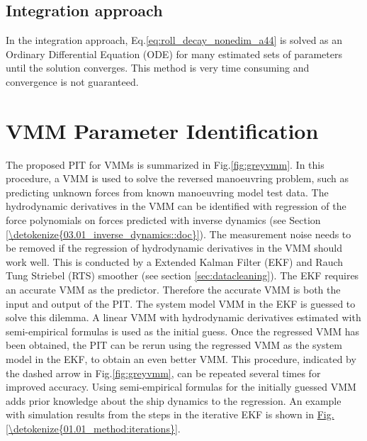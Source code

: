 \subsection{Integration approach}\label{sec:integration_approach}
In the integration approach, Eq.\ref{eq:roll_decay_nonedim_a44} is solved as an Ordinary Differential Equation (ODE) for many estimated sets of parameters until the solution converges. This method is very time consuming and convergence is not guaranteed.

\section{VMM Parameter Identification} \label{sec:PIT_VMM}
The proposed PIT for VMMs is summarized in Fig.\ref{fig:greyvmm}. In this procedure, a VMM is used to solve the reversed manoeuvring problem, such as predicting unknown forces from known manoeuvring model test data. The hydrodynamic derivatives in the VMM can be identified with regression of the force polynomials on forces predicted with inverse dynamics (see Section \ref{\detokenize{03.01_inverse_dynamics::doc}}).
The measurement noise needs to be removed if the regression of hydrodynamic derivatives in the VMM should work well. This is conducted by a Extended Kalman Filter (EKF) and Rauch Tung Striebel (RTS) smoother (see section \ref{sec:datacleaning}). The EKF requires an accurate VMM as the predictor.
Therefore the accurate VMM is both the input and output of the PIT. The system model VMM in the EKF is guessed to solve this dilemma. A linear VMM with hydrodynamic derivatives estimated with semi-empirical formulas is used as the initial guess. Once the regressed VMM has been obtained, the PIT can be rerun using the regressed VMM as the system model in the EKF, to obtain an even better VMM. This procedure, indicated by the dashed arrow in Fig.\ref{fig:greyvmm}, can be repeated several times for improved accuracy. Using semi-empirical formulas for the initially guessed VMM adds prior knowledge about the ship dynamics to the regression. An example with simulation results from the steps in the iterative EKF is shown in \hyperref[\detokenize{01.01_method:iterations}]{Fig.\@\ref{\detokenize{01.01_method:iterations}}}.
\newpage
